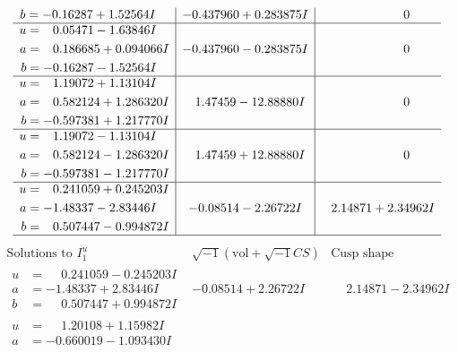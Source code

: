 \documentclass[1p]{elsarticle_modified}
\theoremstyle{definition}
\newcommand{\I}{\sqrt{-1}}
\begin{document}
$$\begin{array}{c|c|c}
\begin{aligned}
b &= -0.16287 + 1.52564 I\end{aligned}
 & -0.437960 + 0.283875 I & \phantom{-0.000000 } 0 \\ \hline\begin{aligned}
u &= \phantom{-}0.05471 - 1.63846 I \\
a &= \phantom{-}0.186685 + 0.094066 I \\
b &= -0.16287 - 1.52564 I\end{aligned}
 & -0.437960 - 0.283875 I & \phantom{-0.000000 } 0 \\ \hline\begin{aligned}
u &= \phantom{-}1.19072 + 1.13104 I \\
a &= \phantom{-}0.582124 + 1.286320 I \\
b &= -0.597381 + 1.217770 I\end{aligned}
 & \phantom{-}1.47459 - 12.88880 I & \phantom{-0.000000 } 0 \\ \hline\begin{aligned}
u &= \phantom{-}1.19072 - 1.13104 I \\
a &= \phantom{-}0.582124 - 1.286320 I \\
b &= -0.597381 - 1.217770 I\end{aligned}
 & \phantom{-}1.47459 + 12.88880 I & \phantom{-0.000000 } 0 \\ \hline\begin{aligned}
u &= \phantom{-}0.241059 + 0.245203 I \\
a &= -1.48337 - 2.83446 I \\
b &= \phantom{-}0.507447 - 0.994872 I\end{aligned}
 & -0.08514 - 2.26722 I & \phantom{-}2.14871 + 2.34962 I\\
 \hline 
 \end{array}$$\newpage$$\begin{array}{c|c|c}  
\text{Solutions to }I^u_{1}& \I (\text{vol} + \sqrt{-1}CS) & \text{Cusp shape}\\
 \hline 
\begin{aligned}
u &= \phantom{-}0.241059 - 0.245203 I \\
a &= -1.48337 + 2.83446 I \\
b &= \phantom{-}0.507447 + 0.994872 I\end{aligned}
 & -0.08514 + 2.26722 I & \phantom{-}2.14871 - 2.34962 I \\ \hline\begin{aligned}
u &= \phantom{-}1.20108 + 1.15982 I \\
a &= -0.660019 - 1.093430 I \\

\end{aligned}
\end{array}$$
\end{document}
